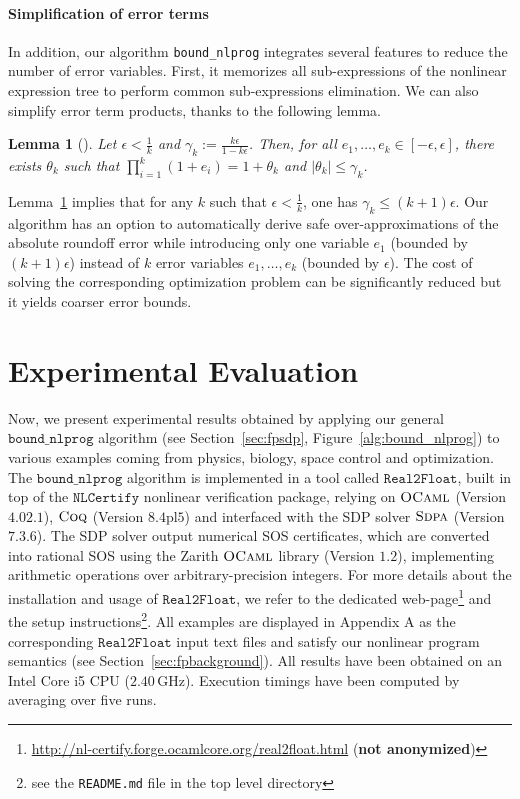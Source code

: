 \documentclass[preprint,fleqn,nocopyrightspace]{sigplanconf}
\newcommand{\code}[1]{\lstinline{#1}}
\newcommand{\boundnlprog}{\mathtt{bound\_nlprog}}
\newcommand{\realtofloat}{\mathtt{Real2Float}}
\newcommand{\coq}{\text{\sc Coq}}
\newcommand{\ocaml}{\text{\sc OCaml}}
\newcommand{\sdpa}{\text{\sc Sdpa}}
\newcommand{\nlcertify}{\mathtt{NLCertify}}
\newtheorem{lemma}[theorem]{Lemma}
\theoremstyle{plain}
\begin{document}
\paragraph{Simplification of error terms}
%
In addition, our algorithm \code{bound_nlprog} integrates several features to reduce the number of error variables. First, it memorizes all sub-expressions of the nonlinear expression tree to perform common sub-expressions elimination. 
We can also simplify error term products, thanks to the following lemma.
\begin{lemma}[]
\label{th:redproduct}
Let $\epsilon < \frac{1}{k}$ and $\gamma_k := \frac{k \epsilon}{1 - k \epsilon}$. Then, for all $e_1, \dots, e_k \in [-\epsilon, \epsilon]$, there exists $\theta_k$ such that ${\prod_{i=1}^k (1 + e_i) = 1 + \theta_k}$ and $\mid \theta_k \mid \leq \gamma_k$.
\end{lemma}
%
Lemma~\ref{th:redproduct} implies that for any $k$ such that $\epsilon < \frac{1}{k}$, one has $\gamma_k \leq (k + 1) \epsilon$. Our algorithm has an option to automatically derive safe over-approximations of the absolute roundoff error while introducing only one variable $e_1$ (bounded by $(k + 1) \epsilon$) instead of $k$ error variables $e_1, \dots, e_k$ (bounded by $\epsilon$). The cost of solving the corresponding optimization problem can be significantly reduced but it yields coarser error bounds.
%
\section{Experimental Evaluation}
\label{sec:benchs}
%
Now, we present experimental results obtained by applying our general $\boundnlprog$ algorithm (see Section~\ref{sec:fpsdp}, Figure~\ref{alg:bound_nlprog}) to various examples coming from physics, biology, space control and optimization. 
The  $\boundnlprog$ algorithm is implemented in a tool called $\realtofloat$, built in top of the $\nlcertify$ nonlinear verification package, relying on $\ocaml$ (Version $4.02.1$), $\coq$ (Version $8.4\text{pl}5$) and interfaced with the SDP solver $\sdpa$ (Version $7.3.6$). The SDP solver output numerical SOS certificates, which are converted into rational SOS using the {\sc Zarith} $\ocaml$ library (Version $1.2$), implementing arithmetic operations over arbitrary-precision integers.
For more details about the installation and usage of $\realtofloat$, we refer to the dedicated web-page\footnote{\url{http://nl-certify.forge.ocamlcore.org/real2float.html} (\textbf{not anonymized})} and the setup instructions\footnote{see the \texttt{README.md} file in the top level directory}. 
All examples are displayed in Appendix A as the corresponding $\realtofloat$ input text files and satisfy our nonlinear program semantics (see Section~\ref{sec:fpbackground}). All results have been obtained on an Intel Core i5 CPU ($2.40\, $GHz). Execution timings have been computed by averaging over five runs.
%
\end{document}
